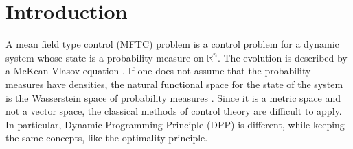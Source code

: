 \documentclass[11pt]{article}
\numberwithin{equation}{section}
\newcommand{\brn}{{\mathbb{R}^n}}
\newcommand{\1}{\mbox{1\hspace{-1mm}I}}
\begin{document}
\begin{abstract}

\end{abstract}



\section{Introduction}\label{sec:intro}

A mean field type control (MFTC) problem \cite{AB_book,MR4177795} is a control problem for a dynamic system whose state is a probability measure on $\brn$. The evolution is described by a McKean-Vlasov equation \cite{McKean,McKean_book}. If one does not assume that the probability measures have densities, the natural functional space for the state of the system is the Wasserstein space of probability measures \cite{AL,VC}. Since it is a metric space and not a vector space, the classical methods of control theory are difficult to apply. In particular, Dynamic Programming Principle (DPP) \cite{AB_JMPA,DMF,PH} is different, while keeping the same concepts, like the optimality principle. 
\end{document}

